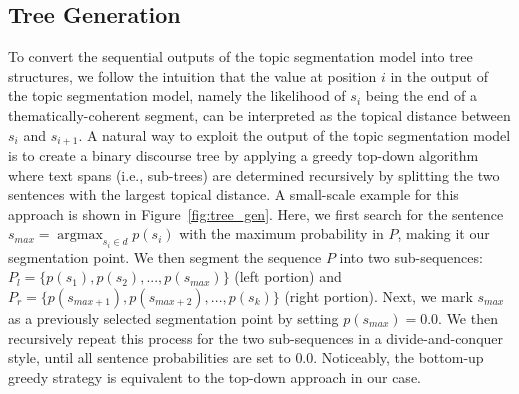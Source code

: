 \documentclass[letterpaper]{article} %
\DeclareMathOperator*{\argmax}{argmax}
\begin{document}
\begin{table}[t]
    \setlength{\belowcaptionskip}{-5pt}
    {\renewcommand{\arraystretch}{1.2}
    \centering
    }
    \caption{Average topic segmentation performance $\pm$ standard deviation over 5 runs, using the $P_k$ error score \cite{Beeferman1999} (lower values indicate better performance) on three evaluation corpora. Best performance per column in \textbf{bold}.}
    \label{tab:ts_ds_performance}
\end{table}

\subsection{Tree Generation}
\label{tree_agg}
To convert the sequential outputs of the topic segmentation model into tree structures,
we follow the intuition that the value at position $i$ in the output of the topic segmentation model, namely the likelihood of $s_i$ being the end of a thematically-coherent segment, can be interpreted as the topical distance between $s_i$ and $s_{i+1}$.
A natural way to exploit the output of the topic segmentation model is to create a binary discourse tree by applying a greedy top-down algorithm where text spans (i.e., sub-trees) are determined recursively by splitting the two sentences with the largest topical distance. A small-scale example for this approach is shown in Figure~\ref{fig:tree_gen}. Here, we first search for the sentence $s_{max} = \argmax_{s_i \in d}{p(s_i)}$ with the maximum probability in $P$, making it our segmentation point. We then segment the sequence $P$ into two sub-sequences: $P_l = \{p(s_1), p(s_2),  ... , p(s_{max})\}$ (left portion) and $P_r = \{p(s_{max+1}), p(s_{max+2}), ... , p(s_{k})\}$ (right portion). Next, we mark $s_{max}$ as a previously selected segmentation point by setting $p(s_{max}) = 0.0$. We then recursively repeat this process for the two sub-sequences in a divide-and-conquer style, until all sentence probabilities are set to $0.0$.
Noticeably, the bottom-up greedy strategy is equivalent to the top-down approach in our case.
\end{document}
